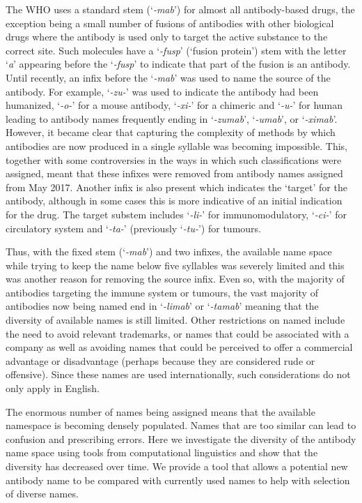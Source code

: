 \documentclass{article}
\newcommand{\eg}[1]{`\emph{#1}'}
\begin{document}
The WHO uses a standard stem (\eg{-mab}) for almost all
antibody-based drugs, the exception being a small number of fusions of
antibodies with other biological drugs where the antibody is used only
to target the active substance to the correct site. Such molecules
have a \eg{-fusp} (`fusion protein') stem with the letter \eg{a}
appearing before the \eg{-fusp} to indicate that part of the fusion
is an antibody. Until recently, an infix before the \eg{-mab} was
used to name the source of the antibody. For example, \eg{-zu-} was
used to indicate the antibody had been humanized, \eg{-o-} for a
mouse antibody, \eg{-xi-} for a chimeric and \eg{-u-} for
human\cite{xxx} leading to antibody names frequently ending in
\eg{-zumab}, \eg{-umab}, or \eg{-ximab}. However, it became
clear that capturing the complexity of methods by which antibodies are
now produced in a single syllable was becoming impossible. This,
together with some controversies in the ways in which such
classifications were assigned, meant that these infixes were removed
from antibody names assigned from May 2017\cite{xxx}. Another infix is
also present which indicates the `target' for the antibody, although in
some cases this is more indicative of an initial indication for the
drug. The target substem includes \eg{-li-} for immunomodulatory,
\eg{-ci-} for circulatory system and \eg{-ta-} (previously
\eg{-tu-}) for tumours.

Thus, with the fixed stem (\eg{-mab}) and two infixes, the available
name space while trying to keep the name below five syllables was
severely limited and this was another reason for removing the source
infix. Even so, with the majority of antibodies targeting the immune
system or tumours, the vast majority of antibodies now being named end
in \eg{-limab} or \eg{-tamab} meaning that the diversity of
available names is still limited. Other restrictions on named include
the need to avoid relevant trademarks, or names that could be
associated with a company as well as avoiding names that could be
perceived to offer a commercial advantage or disadvantage (perhaps
because they are considered rude or offensive). Since these names are
used internationally, such considerations do not only apply in
English.

The enormous number of names being assigned means that the available
namespace is becoming densely populated. Names that are too similar
can lead to confusion and prescribing errors. Here we investigate the
diversity of the antibody name space using tools from computational
linguistics and show that the diversity has decreased over time. We
provide a tool that allows a potential new antibody name to be
compared with currently used names to help with selection of diverse
names.
\end{document}
